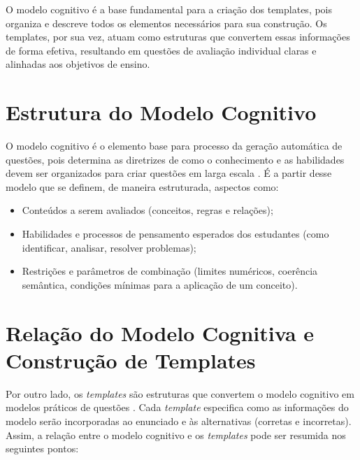 O modelo cognitivo é a base fundamental para a criação dos templates, pois organiza e descreve todos os elementos necessários para sua construção. Os templates, por sua vez, atuam como estruturas que convertem essas informações de forma efetiva, resultando em questões de avaliação individual claras e alinhadas aos objetivos de ensino.


\section{Estrutura do Modelo Cognitivo}

O modelo cognitivo é o elemento base para processo da geração automática de questões, pois determina as diretrizes de como o conhecimento e as habilidades devem ser organizados para criar questões em larga escala \cite{gierl2016, gierl2017, gierlbulutzhang2018, keehner2017}. É a partir desse modelo que se definem, de maneira estruturada, aspectos como:

\begin{itemize} \item Conteúdos a serem avaliados (conceitos, regras e relações); \item Habilidades e processos de pensamento esperados dos estudantes (como identificar, analisar, resolver problemas); \item Restrições e parâmetros de combinação (limites numéricos, coerência semântica, condições mínimas para a aplicação de um conceito). \end{itemize}



\section{Relação do Modelo Cognitiva e Construção de Templates }

Por outro lado, os \textit{templates} são estruturas que convertem o modelo cognitivo em modelos práticos de questões \cite{gierl2024}. Cada \textit{template} especifica como as informações do modelo serão incorporadas ao enunciado e às alternativas (corretas e incorretas). Assim, a relação entre o modelo cognitivo e os \textit{templates} pode ser resumida nos seguintes pontos:

